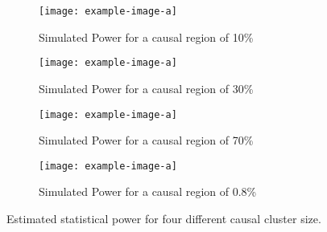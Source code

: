 \begin{figure}[ht!]
	\centering
  \begin{subfigure}[t]{0.48\textwidth}
    \centering
	\texttt{[image: example-image-a]}
  \caption{Simulated Power for a causal region of 10\%}
  \end{subfigure}
  \begin{subfigure}[t]{0.48\textwidth}
    \centering
	\texttt{[image: example-image-a]}
  \caption{Simulated Power for a causal region of 30\%}
  \end{subfigure}
  \begin{subfigure}[t]{0.48\textwidth}
    \centering
	\texttt{[image: example-image-a]}
  \caption{Simulated Power for a causal region of 70\%}
  \end{subfigure}
  \begin{subfigure}[t]{0.48\textwidth}
    \centering
	\texttt{[image: example-image-a]}
  \caption{Simulated Power for a causal region of 0.8\%}
  \end{subfigure}
	\caption{Estimated statistical power for four different causal cluster size.\label{fig:simulatedGeneRealData}}
\end{figure}
